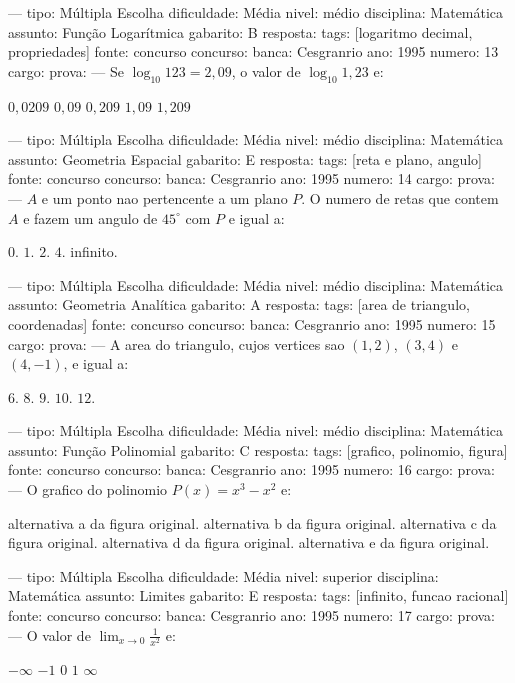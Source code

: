 ---
tipo: Múltipla Escolha
dificuldade: Média
nivel: médio
disciplina: Matemática
assunto: Função Logarítmica
gabarito: B
resposta:
tags: [logaritmo decimal, propriedades]
fonte: concurso
concurso:
banca: Cesgranrio
ano: 1995
numero: 13
cargo:
prova:
---
\question
Se $\log_{10} 123 = 2,09$, o valor de $\log_{10} 1,23$ e:
\begin{choices}
\choice $0,0209$
\CorrectChoice $0,09$
\choice $0,209$
\choice $1,09$
\choice $1,209$
\end{choices}

---
tipo: Múltipla Escolha
dificuldade: Média
nivel: médio
disciplina: Matemática
assunto: Geometria Espacial
gabarito: E
resposta:
tags: [reta e plano, angulo]
fonte: concurso
concurso:
banca: Cesgranrio
ano: 1995
numero: 14
cargo:
prova:
---
\question
$A$ e um ponto nao pertencente a um plano $P$. O numero de retas que contem $A$ e fazem um angulo de $45^\circ$ com $P$ e igual a:
\begin{choices}
\choice $0$.
\choice $1$.
\choice $2$.
\choice $4$.
\CorrectChoice infinito.
\end{choices}

---
tipo: Múltipla Escolha
dificuldade: Média
nivel: médio
disciplina: Matemática
assunto: Geometria Analítica
gabarito: A
resposta:
tags: [area de triangulo, coordenadas]
fonte: concurso
concurso:
banca: Cesgranrio
ano: 1995
numero: 15
cargo:
prova:
---
\question
A area do triangulo, cujos vertices sao $(1, 2)$, $(3, 4)$ e $(4, -1)$, e igual a:
\begin{choices}
\CorrectChoice $6$.
\choice $8$.
\choice $9$.
\choice $10$.
\choice $12$.
\end{choices}

---
tipo: Múltipla Escolha
dificuldade: Média
nivel: médio
disciplina: Matemática
assunto: Função Polinomial
gabarito: C
resposta:
tags: [grafico, polinomio, figura]
fonte: concurso
concurso:
banca: Cesgranrio
ano: 1995
numero: 16
cargo:
prova:
---
\question
O grafico do polinomio $P(x) = x^3 - x^2$ e:
\begin{choices}
\choice alternativa a da figura original.
\choice alternativa b da figura original.
\CorrectChoice alternativa c da figura original.
\choice alternativa d da figura original.
\choice alternativa e da figura original.
\end{choices}


---
tipo: Múltipla Escolha
dificuldade: Média
nivel: superior
disciplina: Matemática
assunto: Limites
gabarito: E
resposta:
tags: [infinito, funcao racional]
fonte: concurso
concurso:
banca: Cesgranrio
ano: 1995
numero: 17
cargo:
prova:
---
\question
O valor de $\lim_{x \to 0} \frac{1}{x^2}$ e:
\begin{choices}
\choice $-\infty$
\choice $-1$
\choice $0$
\choice $1$
\CorrectChoice $\infty$
\end{choices}

